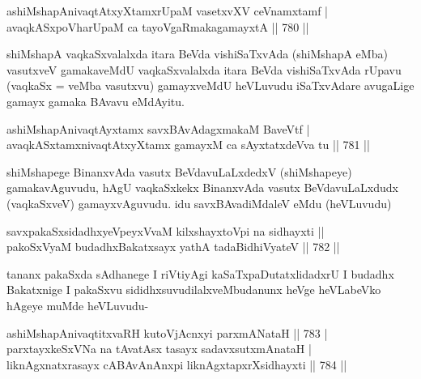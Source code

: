 \begin{shl}
ashiMshapAnivaqtAtxyXtamxrUpaM vasetxvXV ceVnamxtamf | \\
avaqkASxpoVharUpaM ca tayoVgaRmakagamayxtA \hfill||  780 ||  
\end{shl}

\begin{artha}
shiMshapA vaqkaSxvalalxda itara BeVda vishiSaTxvAda (shiMshapA eMba) vasutxveV gamakaveMdU vaqkaSxvalalxda itara BeVda vishiSaTxvAda rUpavu (vaqkaSx = veMba vasutxvu) gamayxveMdU heVLuvudu iSaTxvAdare avugaLige gamayx gamaka BAvavu eMdAyitu.
\end{artha}


\begin{shl}
ashiMshapAnivaqtAyxtamx savxBAvAdagxmakaM BaveVtf | \\
avaqkASxtamxnivaqtAtxyXtamx gamayxM ca sAyxtatxdeVva tu \hfill||  781 ||  
\end{shl}

\begin{artha}
shiMshapege BinanxvAda vasutx BeVdavuLaLxdedxV (shiMshapeye) gamakavAguvudu, hAgU vaqkaSxkekx BinanxvAda vasutx BeVdavuLaLxdudx (vaqkaSxveV) gamayxvAguvudu. idu savxBAvadiMdaleV eMdu (heVLuvudu)
\end{artha}


\begin{shl}
savxpakaSxsidadhxyeV\s peyxVvaM kilxshayxtoV\s pi na sidhayxti ||  \\
pakoSxV\s yaM budadhxBakatxsayx yathA tadaBidhiVyateV \hfill||  782 ||  
\end{shl}

\begin{artha}
tananx pakaSxda sAdhanege I riVtiyAgi kaSaTxpaDutatxlidadxrU I budadhx Bakatxnige I pakaSxvu sididhxsuvudilalxveMbudanunx heVge heVLabeVko hAgeye muMde heVLuvudu-
\end{artha}


\begin{shl}
ashiMshapAnivaqtitxvaRH kutoV\s jAcnxyi parxmANataH \hfill||  783 | \\
parxtayxkeSxVNa na tAvatAsx tasayx sadavxsutxmAnataH | \\
liknAgxnatxrasayx cABAvAnAnxpi liknAgxtapxrXsidhayxti \hfill||  784 ||  
\end{shl}

